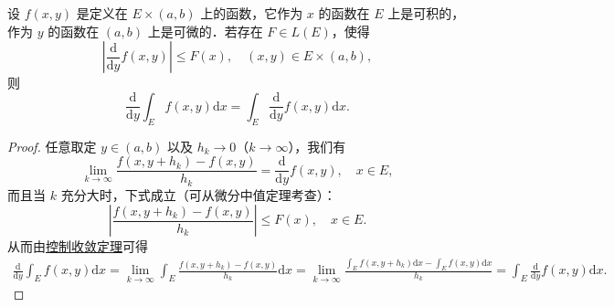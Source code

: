 \documentclass[../../main.tex]{subfiles}
\begin{document}
\begin{theorem}[积分号下求导]\label{theorem:积分号下求导}
设 \( f(x,y) \) 是定义在 \( E \times (a,b) \) 上的函数，它作为 \( x \) 的函数在 \( E \) 上是可积的，作为 \( y \) 的函数在 \( (a,b) \) 上是可微的．若存在 \( F \in L(E) \)，使得
\[
\left| \frac{\mathrm{d}}{\mathrm{d}y} f(x,y) \right| \leqslant F(x), \quad (x,y) \in E \times (a,b),
\]
则
\[
\frac{\mathrm{d}}{\mathrm{d}y} \int_E f(x,y) \mathrm{d}x = \int_E \frac{\mathrm{d}}{\mathrm{d}y} f(x,y) \mathrm{d}x. 
\]
\end{theorem}
\begin{proof}
任意取定 \( y \in (a,b) \) 以及 \( h_k \to 0 \)（\( k \to \infty \)），我们有
\[
\lim_{k \to \infty} \frac{f(x,y + h_k) - f(x,y)}{h_k} = \frac{\mathrm{d}}{\mathrm{d}y} f(x,y), \quad x \in E,
\]
而且当 \( k \) 充分大时，下式成立（可从微分中值定理考查）：
\[
\left| \frac{f(x,y + h_k) - f(x,y)}{h_k} \right| \leqslant F(x), \quad x \in E.
\]
从而由\hyperref[theorem:控制收敛定理]{控制收敛定理}可得
\begin{align*}
\frac{\mathrm{d}}{\mathrm{d}y}\int_E{f(x,y)\mathrm{d}x}=\lim_{k\rightarrow \infty} \int_E{\frac{f(x,y+h_k)-f(x,y)}{h_k}\mathrm{d}x}=\lim_{k\rightarrow \infty} \frac{\int_E{f\left( x,y+h_k \right) \mathrm{d}x}-\int_E{f\left( x,y \right) \mathrm{d}x}}{h_k}=\int_E{\frac{\mathrm{d}}{\mathrm{d}y}f(x,y)\mathrm{d}x}.
\end{align*}

\end{proof}
\end{document}
